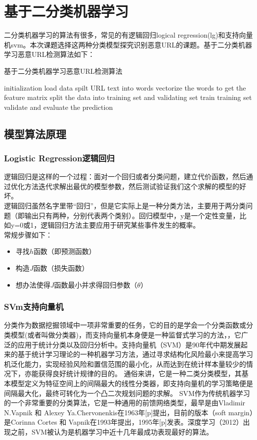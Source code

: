 \section{基于二分类机器学习}
二分类机器学习的算法有很多，常见的有逻辑回归logical regression(lg)和支持向量机svm。本次课题选择这两种分类模型探究识别恶意URL的课题。基于二分类机器学习恶意URL检测算法如下：
\begin{algorithm}[!h]
    \SetAlgoNoLine
    \caption{基于二分类机器学习恶意URL检测算法}
    initialization\;
    load data\; 
    spilt URL text into words\;
    vectorize the words to get the feature matrix\;
    split the data into training set and validating set\;
    train training set\;
    validate and evaluate the prediction\;
\end{algorithm}
\subsection{模型算法原理}
\subsubsection{Logistic Regression逻辑回归}
逻辑回归是这样的一个过程：面对一个回归或者分类问题，建立代价函数，然后通过优化方法迭代求解出最优的模型参数，然后测试验证我们这个求解的模型的好坏。
\\\indent{}逻辑回归虽然名字里带“回归”，但是它实际上是一种分类方法，主要用于两分类问题（即输出只有两种，分别代表两个类别）。回归模型中，y是一个定性变量，比如y=0或1，逻辑回归方法主要应用于研究某些事件发生的概率。
\\\indent{}常规步骤如下：
\begin{itemize}
    \item 寻找$h$函数（即预测函数）
    \item 构造$J$函数（损失函数）
    \item 想办法使得$J$函数最小并求得回归参数（$\theta$）
\end{itemize}
\subsubsection{SVm支持向量机}
分类作为数据挖掘领域中一项非常重要的任务，它的目的是学会一个分类函数或分类模型(或者叫做分类器)，而支持向量机本身便是一种监督式学习的方法，，它广泛的应用于统计分类以及回归分析中。支持向量机（SVM）是90年代中期发展起来的基于统计学习理论的一种机器学习方法，通过寻求结构化风险最小来提高学习机泛化能力，实现经验风险和置信范围的最小化，从而达到在统计样本量较少的情况下，亦能获得良好统计规律的目的。
通俗来讲，它是一种二类分类模型，其基本模型定义为特征空间上的间隔最大的线性分类器，即支持向量机的学习策略便是间隔最大化，最终可转化为一个凸二次规划问题的求解。
SVM作为传统机器学习的一个非常重要的分类算法，它是一种通用的前馈网络类型，最早是由Vladimir N.Vapnik 和 Alexey Ya.Chervonenkis在1963年[p]提出，目前的版本（soft margin）是Corinna Cortes 和 Vapnik在1993年提出，1995年[p]发表。深度学习（2012）出现之前，SVM被认为是机器学习中近十几年最成功表现最好的算法。
